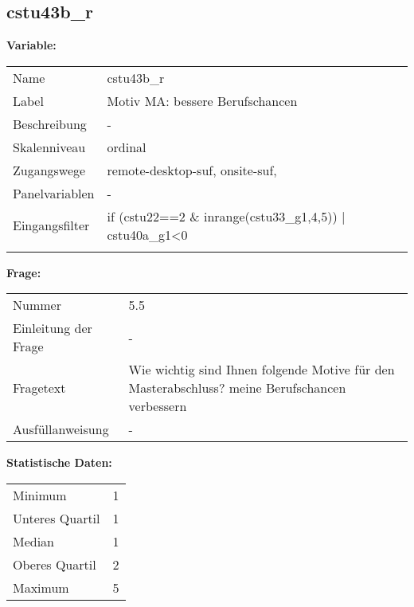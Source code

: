 	
	
	\subsection{cstu43b\_r}
	\label{subSection:cstu43b_r}

	\noindent\textbf{Variable:}\\
		\begin{tabular}{lL{11.3cm}}
			\label{tableVariable:cstu43b_r}
			Name & cstu43b\_r \\
			Label & Motiv MA: bessere Berufschancen \\
			Beschreibung & - \\
			Skalenniveau & ordinal \\
			Zugangswege &
				remote-desktop-suf,
				onsite-suf,
 \\
			Panelvariablen & -
			 \\
			Eingangsfilter & if (cstu22==2 \& inrange(cstu33\_g1,4,5)) | cstu40a\_g1\textless{}0 \\
 \\
		\end{tabular}

		\vspace*{1 cm}
		\noindent\textbf{Frage:}\\
		\begin{tabular}{lL{11.3cm}}
			\label{tableQuestion:cstu43b_r}
			Nummer & 5.5 \\
			Einleitung der Frage & - \\
			Fragetext & Wie wichtig sind Ihnen folgende Motive für den Masterabschluss?
meine Berufschancen verbessern \\
			Ausfüllanweisung & - \\
		\end{tabular}


		\vspace*{1 cm}
		\noindent\textbf{Statistische Daten:}\\
			\begin{tabular}{ll}
				\label{tableStatistics:cstu43b_r}
					Minimum & 1 \\
					Unteres Quartil & 1 \\
					Median & 1 \\
					Oberes Quartil & 2 \\
					Maximum & 5 \\
			\end{tabular}




